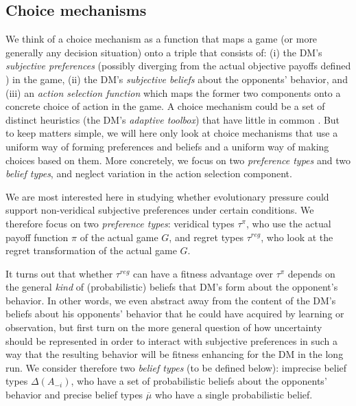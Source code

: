 \documentclass[fleqn,reqno,11pt]{article}
\begin{document}
\subsection{Choice mechanisms}
\label{sec:choice-mechanisms}

We think of a choice mechanism as a function that maps a game (or more generally any decision
situation) onto a triple that consists of: (i) the DM's \emph{subjective preferences} (possibly
diverging from the actual objective payoffs defined ) in the game, (ii) the DM's
\emph{subjective beliefs} about the opponents' behavior, and (iii) an \emph{action selection
  function} which maps the former two components onto a concrete choice of action in the
game. A choice mechanism could be a set of distinct heuristics (the DM's \emph{adaptive
  toolbox}) that have little in common
\citep[e.g.][]{TverskyKahnemann1981:The-Framing-of-,GigerenzerGoldstein1996:Reasoning-the-F,ScheibehenneRieskamp2013:Testing-the-Ada}. But
to keep matters simple, we will here only look at choice mechanisms that use a uniform way of
forming preferences and beliefs and a uniform way of making choices based on them. More
concretely, we focus on two \emph{preference types} and two \emph{belief types}, and neglect
variation in the action selection component. 

We are most interested here in studying whether evolutionary pressure could support
non-veridical subjective preferences under certain conditions. We therefore focus on two
\emph{preference types}: veridical types $\tau^\pi$, who use the actual payoff function $\pi$ of the
actual game $G$, and regret types $\tau^{reg}$, who look at the regret transformation of the
actual game $G$. 

It turns out that whether $\tau^{reg}$ can have a fitness advantage over $\tau^\pi$ depends on
the general \emph{kind} of (probabilistic) beliefs that DM's form about the opponent's
behavior. In other words, we even abstract away from the content of the DM's beliefs about his
opponents' behavior that he could have acquired by learning or observation, but first turn on
the more general question of how uncertainty should be represented in order to interact with
subjective preferences in such a way that the resulting behavior will be fitness enhancing for
the DM in the long run. We consider therefore two \emph{belief types} (to be defined below):
imprecise belief types $\Delta(A_{-i})$, who have a set of probabilistic beliefs about the
opponents' behavior and precise belief types $\overline{\mu}$ who have a single probabilistic
belief.
\end{document}
